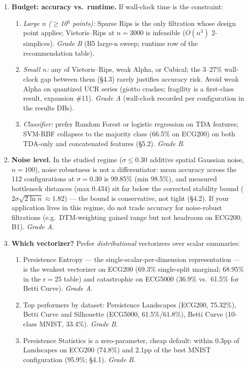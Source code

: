 \begin{enumerate}
  \item \textbf{Budget: accuracy vs.\ runtime.} If wall-clock time is the
    constraint:
    \begin{enumerate}
      \item \emph{Large $n$ ($\ge$10$^3$ points):} Sparse Rips is the only
        filtration whose design point applies; Vietoris--Rips at $n{=}3000$ is
        infeasible ($O(n^3)$ 2-simplices). \emph{Grade B} (B5 large-n sweep;
        runtime row of the recommendation table).
      \item \emph{Small $n$:} any of Vietoris--Rips, weak Alpha, or Cubical;
        the 3--27\% wall-clock gap between them (\S4.3) rarely justifies
        accuracy risk. Avoid weak Alpha on quantized UCR series (giotto
        crashes; fragility is a first-class result, expansion \#11).
        \emph{Grade A} (wall-clock recorded per configuration in the results
        DBs).
      \item \emph{Classifier:} prefer Random Forest or logistic regression on
        TDA features; SVM-RBF collapses to the majority class (66.5\% on
        ECG200) on both TDA-only and concatenated features (\S5.2).
        \emph{Grade B}.
    \end{enumerate}

  \item \textbf{Noise level.} In the studied regime ($\sigma \le 0.30$
    additive spatial Gaussian noise, $n{=}100$), noise robustness is not a
    differentiator: mean accuracy across the 112 configurations at
    $\sigma{=}0.30$ is 99.85\% (min 98.5\%), and measured bottleneck distances
    (max 0.434) sit far below the corrected stability bound
    ($2\sigma\sqrt{2\ln n} \approx 1.82$) --- the bound is conservative, not
    tight (\S4.2). If your application lives in this regime, do not trade
    accuracy for noise-robust filtrations (e.g.\ DTM-weighting gained range
    but not headroom on ECG200; B1). \emph{Grade A}.

  \item \textbf{Which vectorizer?} Prefer \emph{distributional} vectorizers
    over scalar summaries:
    \begin{enumerate}
      \item Persistence Entropy --- the single-scalar-per-dimension
        representation --- is the weakest vectorizer on ECG200 (69.3\%
        single-split marginal; 68.95\% in the r$=$25 table) and catastrophic
        on ECG5000 (36.9\% vs.\ 61.5\% for Betti Curve). \emph{Grade A}.
      \item Top performers by dataset: Persistence Landscapes (ECG200,
        75.32\%), Betti Curve and Silhouette (ECG5000, 61.5\%/61.8\%),
        Betti Curve (10-class MNIST, 33.4\%). \emph{Grade B}.
      \item Persistence Statistics is a zero-parameter, cheap default: within
        0.3pp of Landscapes on ECG200 (74.8\%) and 2.1pp of the best MNIST
        configuration (95.9\%; \S4.1). \emph{Grade B}.
    \end{enumerate}


\end{enumerate}
